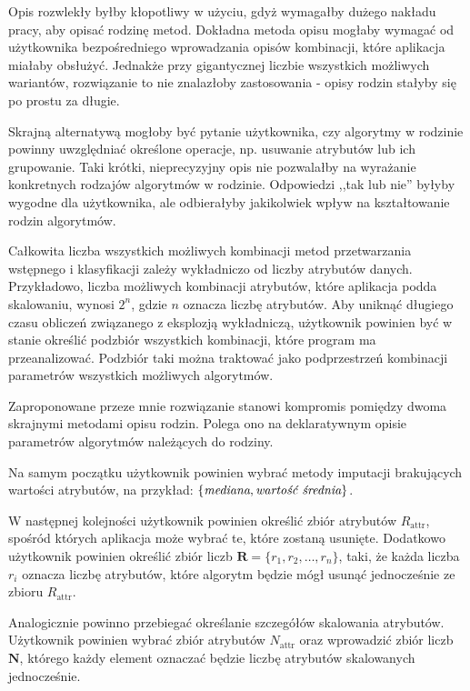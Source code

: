 \documentclass[../thesis.tex]{subfiles}
\begin{document}
Opis rozwlekły byłby kłopotliwy w użyciu, gdyż wymagałby dużego nakładu pracy, aby opisać rodzinę metod. Dokładna metoda opisu mogłaby wymagać od użytkownika bezpośredniego wprowadzania opisów kombinacji, które aplikacja miałaby obsłużyć. Jednakże przy gigantycznej liczbie wszystkich możliwych wariantów, rozwiązanie to nie znalazłoby zastosowania - opisy rodzin stałyby się po prostu za długie. 

Skrajną alternatywą mogłoby być pytanie użytkownika, czy algorytmy w rodzinie powinny uwzględniać określone operacje, np. usuwanie atrybutów lub ich grupowanie. Taki krótki, nieprecyzyjny opis nie pozwalałby na wyrażanie konkretnych rodzajów algorytmów w rodzinie.  Odpowiedzi ,,tak lub nie'' byłyby wygodne dla użytkownika, ale odbierałyby jakikolwiek wpływ na kształtowanie rodzin algorytmów.

Całkowita liczba wszystkich możliwych kombinacji metod przetwarzania wstępnego i klasyfikacji zależy wykładniczo od liczby atrybutów danych. Przykładowo, liczba możliwych kombinacji atrybutów, które aplikacja podda skalowaniu, wynosi $2^{n}$, gdzie $n$ oznacza liczbę atrybutów. Aby uniknąć długiego czasu obliczeń związanego z eksplozją wykładniczą, użytkownik powinien być w stanie określić podzbiór wszystkich kombinacji, które program ma przeanalizować. Podzbiór taki można traktować jako podprzestrzeń kombinacji parametrów wszystkich możliwych algorytmów.

Zaproponowane przeze mnie rozwiązanie stanowi kompromis pomiędzy dwoma skrajnymi metodami opisu rodzin. Polega ono na deklaratywnym opisie parametrów algorytmów należących do rodziny. 

Na samym początku użytkownik powinien wybrać metody imputacji brakujących wartości atrybutów, na przykład: $\{\emph{mediana}, \emph{wartość średnia}\}$.

W następnej kolejności użytkownik powinien określić zbiór atrybutów $R_\textrm{attr}$, spośród których aplikacja może wybrać te, które zostaną usunięte. Dodatkowo użytkownik powinien określić zbiór liczb $\textbf{R} = \{r_1, r_2, \ldots, r_n\}$, taki, że każda liczba $r_i$ oznacza liczbę atrybutów, które algorytm będzie mógł usunąć jednocześnie ze zbioru $R_\textrm{attr}$.

Analogicznie powinno przebiegać określanie szczegółów skalowania atrybutów. Użytkownik powinien wybrać zbiór atrybutów $N_\textrm{attr}$ oraz wprowadzić zbiór liczb $\textbf{N}$, którego każdy element oznaczać będzie liczbę atrybutów skalowanych jednocześnie.
\end{document}
